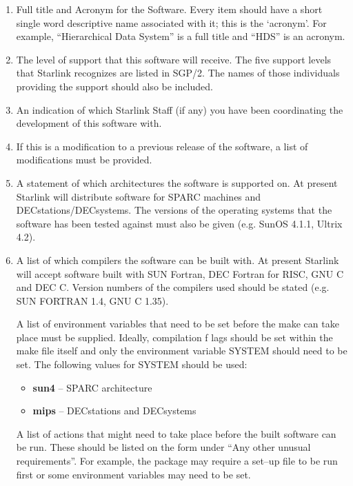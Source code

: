 \begin{enumerate}

\item Full title and Acronym for the Software.
Every item should have a short single word descriptive name associated
with it; this is the `acronym'.
For example, ``Hierarchical Data System'' is a full title and ``HDS'' is
an acronym.

\item The level of support that this software will receive.
The five support levels that Starlink recognizes are listed in SGP/2.
The names of those individuals providing the support should also be included.

\item An indication of which Starlink Staff (if any) you have been
coordinating the development of this software with.

\item If this is a modification to a previous release of the software, a list
of modifications must be provided.

\item A statement of which architectures the software is supported on. At present
Starlink will distribute software for SPARC machines and
DECstations/DECsystems.  The versions of the operating systems that the software
has been tested against must also be given (e.g. SunOS 4.1.1,  Ultrix 4.2).

\item A list of which compilers the software can be built with. At present
Starlink will accept software built with SUN Fortran, DEC Fortran for RISC,
GNU C and
DEC C. Version numbers of the compilers used should be stated (e.g. SUN FORTRAN
1.4, GNU C 1.35).

A list of environment variables that need to be set before the make can
take place must be supplied. Ideally, compilation f
lags should be set within the make file
itself and only the environment variable SYSTEM should need to be set.
The following values for SYSTEM should be used:

\begin{itemize}

\item {\bf sun4} -- SPARC architecture

\item {\bf mips} -- DECstations and DECsystems


\end{itemize}

A list of actions that might need to take place before the
built software can be run. These should be listed on the form under
``Any other unusual requirements''. For example, the package may require a
set--up file to be run first or some environment variables may need to
be set.


\end{enumerate}
